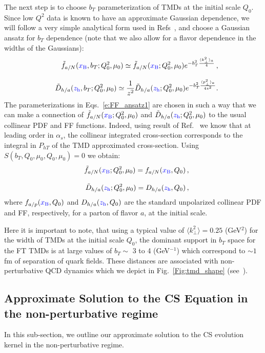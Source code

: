 \documentclass[final,3p,times,onecolumn,sort&compress,hidelinks]{elsarticle}
\newcommand{\xbj}{\ensuremath{{\cbl x_{\rm B}}}}
\newcommand{\zh}{\ensuremath{{\cbl z_{\rm h}}}}
\newcommand\3[1]{\boldsymbol{#1}}
\newcommand{\crd}{\color{red}}
\newcommand{\cbl}{\color{blue}}
\begin{document}
The next step is to choose $b_T$ parameterization of TMDs at the initial scale $Q_0$.
 Since low $Q^2$ data is known \cite{Schweitzer:2010tt} to have an approximate Gaussian dependence, we will follow a very simple analytical form used in Refs~\cite{Anselmino:2013lza,Signori:2013mda}, and choose a Gaussian ansatz for $b_T$ dependence (note that we also allow for a flavor dependence in the widths of the Gaussians):
\begin{eqnarray}
&&\tilde f_{a/N} (\xbj,b_T; Q_0^2, \mu_0)\simeq  \tilde f_{a/N} (\xbj; Q_0^2, \mu_0) e^{-b_T^2 \frac{\langle k_\perp^2 \rangle_a}{4}}\,,
\nonumber \\[0.3cm]
&&\tilde D_{h/a}(\zh,b_T; Q_0^2, \mu_0)\simeq \frac{1}{z^2}  \tilde D_{h/a}(\zh; Q_0^2, \mu_0) e^{-b_T^2 \frac{\langle p_\perp^2 \rangle_a}{4 z^2}}.
\label{e:FF_ansatz1}
\end{eqnarray}
The parameterizations in Eqs.~\eqref{e:FF_ansatz1} are chosen in such a way that we can make a connection of $\tilde f_{a/N} (\xbj; Q_0^2, \mu_0)$ and $\tilde D_{h/a}(\zh; Q_0^2, \mu_0)$ to the usual collinear PDF and FF functions. Indeed, using result of Ref.~\cite{Collins:2016hqq} we know that at leading order in $\alpha_s$, the collinear integrated cross-section corresponds to the integral in $P_{hT}$ of the TMD approximated cross-section. Using $S(b_T, Q_0, \mu_0, Q_0, \mu_0) = 0$ we obtain:
\begin{eqnarray}
&&\tilde f_{a/N} (\xbj; Q_0^2, \mu_0) = f_{a/N} (\xbj, Q_0)\,,
\\[0.3cm]
&&\tilde D_{h/a}(\zh; Q_0^2, \mu_0) = D_{h/a}(\zh, Q_0)\,,
\label{e:FF_ansatz2}
\end{eqnarray}
where $f_{a/p} (\xbj, Q_0)$ and $D_{h/a}(\zh, Q_0)$ are the standard unpolarized collinear PDF and FF, respectively, for a parton of flavor $a$, at the initial scale.


Here it is important to note, that using a typical value of $\langle k_\perp^2 \rangle = 0.25$ (GeV$^2$) \cite{Anselmino:2005nn} for the width of TMDs at the initial scale $Q_0$, the dominant support in $b_T$ space  for the FT TMDs is at large values of $b_T \sim $ 3 to 4 (GeV$^{-1}$) which correspond to $\sim 1$ fm of separation of quark fields.  These distances are associated with non-perturbative QCD dynamics which we  depict in Fig.~\ref{Fig:tmd_shape}  (see~\cite{Aidala:2014hva}).


\subsection{Approximate Solution to the CS Equation in the non-perturbative regime}
 In this sub-section, we outline our approximate solution to the CS evolution kernel in the non-perturbative regime.
\end{document}
